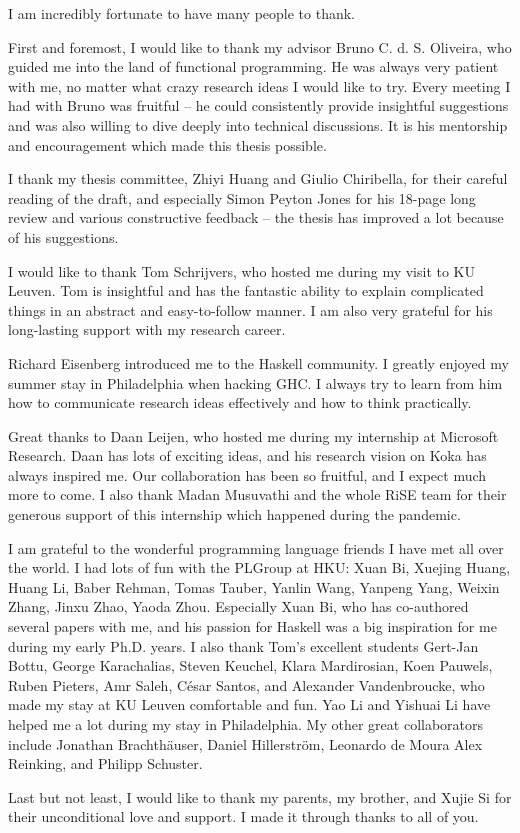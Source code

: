 I am incredibly fortunate to have many people to thank.

First and foremost, I would like to thank my advisor Bruno C. d. S. Oliveira,
who guided me into the land of functional programming. He was always very
patient with me, no matter what crazy research ideas I would like to try. Every
meeting I had with Bruno was fruitful -- he could consistently provide insightful
suggestions and was also willing to dive deeply into technical discussions. It
is his mentorship and encouragement which made this thesis possible.

I thank my thesis committee, Zhiyi Huang and Giulio Chiribella, for their careful
reading of the draft, and especially Simon Peyton Jones for his 18-page long
review and various constructive feedback -- the thesis has improved a lot
because of his suggestions.

I would like to thank Tom Schrijvers, who hosted me during my visit to KU
Leuven. Tom is insightful and has the fantastic ability to explain complicated
things in an abstract and easy-to-follow manner. I am also very grateful for his
long-lasting support with my research career.

Richard Eisenberg introduced me to the Haskell community. I greatly enjoyed my
summer stay in Philadelphia when hacking GHC. I always try to learn from him how
to communicate research ideas effectively and how to think practically.

Great thanks to Daan Leijen, who hosted me during my internship at Microsoft
Research. Daan has lots of exciting ideas, and his research vision on Koka has
always inspired me. Our collaboration has been so fruitful, and I expect much
more to come. I also thank Madan Musuvathi and the whole RiSE team for their
generous support of this internship which happened during the pandemic.

I am grateful to the wonderful programming language friends I have met all over
the world. I had lots of fun with the PLGroup at HKU: Xuan Bi, Xuejing Huang,
Huang Li, Baber Rehman, Tomas Tauber, Yanlin Wang, Yanpeng Yang, Weixin Zhang,
Jinxu Zhao, Yaoda Zhou. Especially Xuan Bi, who has co-authored several papers
with me, and his passion for Haskell was a big inspiration for me during my
early Ph.D. years. I also thank Tom's excellent students Gert-Jan Bottu, George
Karachalias, Steven Keuchel, Klara Mardirosian, Koen Pauwels, Ruben Pieters, Amr
Saleh, César Santos, and Alexander Vandenbroucke, who made my stay at KU Leuven
comfortable and fun. Yao Li and Yishuai Li have helped me a lot during my stay
in Philadelphia. My other great collaborators include Jonathan Brachthäuser,
Daniel Hillerström, Leonardo de Moura Alex Reinking, and Philipp Schuster.

Last but not least, I would like to thank my parents, my brother, and Xujie Si
for their unconditional love and support. I made it through thanks to all of
you.